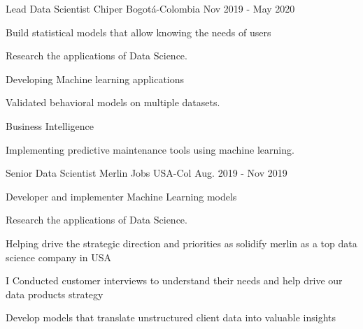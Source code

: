 

\begin{cventries}

  \cventry
    {Lead Data Scientist} %
    {Chiper} %
    {Bogotá-Colombia} %
    {Nov 2019 - May 2020} %
    {
      \begin{cvitems} %
        \item {Build statistical models that allow knowing the needs of users}
        \item {Research the applications of Data Science.}
        \item {Developing Machine learning applications}
        \item {Validated behavioral models on multiple datasets.}
        \item {Business Intelligence}
        \item{Implementing predictive maintenance tools using machine learning.}
      \end{cvitems}
    }

  
  \cventry
    {Senior Data Scientist} %
    {Merlin Jobs} %
    {USA-Col} %
    {Aug. 2019 - Nov 2019} %
    {
      \begin{cvitems} %
        \item {Developer and implementer Machine Learning models}
        \item {Research the applications of Data Science.}
        \item {Helping drive the strategic direction and priorities as  solidify merlin as a top data science company in USA}
        \item {I Conducted customer interviews to understand their needs and help drive our data products strategy}
        \item {Develop models that translate unstructured client data into valuable insights}
      \end{cvitems}
    }


\end{cventries}
